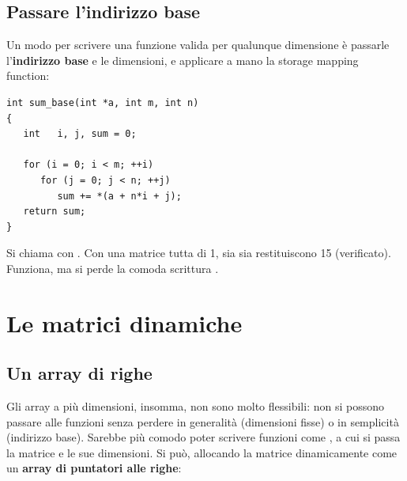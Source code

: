 \subsection{Passare l'indirizzo base}

Un modo per scrivere una funzione valida per qualunque dimensione è passarle
l'\textbf{indirizzo base} e le dimensioni, e applicare a mano la storage
mapping function:

\begin{affianco}[0.5][c]
\begin{lstlisting}[style=c]
int sum_base(int *a, int m, int n)
{
   int   i, j, sum = 0;

   for (i = 0; i < m; ++i)
      for (j = 0; j < n; ++j)
         sum += *(a + n*i + j);
   return sum;
}
\end{lstlisting}
\risultato
Si chiama con . Con una matrice
 tutta di 1, sia  sia
 restituiscono 15 (verificato). Funziona,
ma si perde la comoda scrittura .
\end{affianco}

\section{Le matrici dinamiche}

\subsection{Un array di righe}

Gli array a più dimensioni, insomma, non sono molto flessibili: non si
possono passare alle funzioni senza perdere in generalità (dimensioni fisse)
o in semplicità (indirizzo base). Sarebbe più comodo poter scrivere funzioni
come , a cui si passa la matrice e le
sue dimensioni. Si può, allocando la matrice dinamicamente come un
\textbf{array di puntatori alle righe}:


